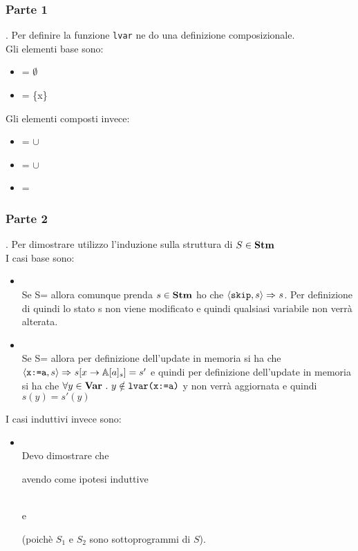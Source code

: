 {
	\subsubsection{Parte 1}.
	Per definire la funzione \texttt{lvar} ne do una definizione
	composizionale. \\
	Gli elementi base sono:
	\begin{itemize}
	\item \lvar{\skipistr} = $\emptyset$
	\item {} = \{x\}
	\end{itemize}
	Gli elementi composti invece:
	\begin{itemize}
	\item {} =  $\cup$ 
	\item {} =  $\cup$ 
	\item {} = 
	\end{itemize}

	\subsubsection{Parte 2}. Per dimostrare \exTwo{} utilizzo l'induzione sulla struttura
	di $S\in\mbox{\textbf{Stm}}$ \\
	
	I casi base sono:
	\begin{itemize}
	\item {}
	\casespace
	\\
	Se S=\skipistr{} allora comunque prenda 
	$s\in\mbox{\textbf{Stm}}$ ho che $\langle{}\textrm{\normalfont{\texttt{skip}}}, s\rangle{}\Rightarrow^{}s$. Per definizione di 
	\skipistr{} quindi lo stato s non viene modificato e quindi qualsiasi
	variabile non verrà alterata.

	\item {}
	\casespace
	\\
	 Se S= allora per
	definizione dell'update in memoria si ha che 
	$\langle{}\textrm{\normalfont{\texttt{x:=a}}}, s\rangle{}\Rightarrow^{}s[x\rightarrow\mathbb{A}[a]_s]=s'$ e
	quindi per definizione dell'update in memoria si ha che 
	$\forall{}y\in\mbox{\textbf{Var}}~.~y\notin\textrm{\normalfont{\texttt{lvar(\textrm{\normalfont{\texttt{x:=a}}})}}}$ y non verrà aggiornata
	e quindi $s(y)=s'(y)$
	\end{itemize}


	I casi induttivi invece sono:
	\begin{itemize}
	\item {}
    \casespace
	\\
	Devo dimostrare che 
	\begin{center}
	\end{center}
	avendo come ipotesi induttive
	\begin{center}		
	 \\
	e\\
	\end{center}
	(poichè $S_1$ e $S_2$ sono sottoprogrammi di $S$). 
	

\end{itemize}}
